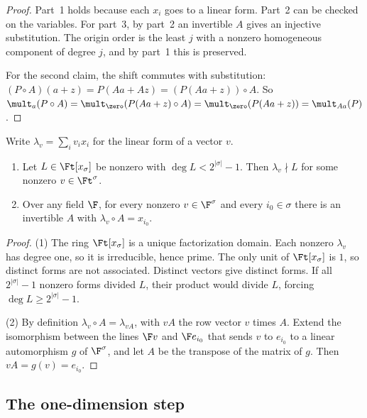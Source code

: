 \begin{proof}
Part~1 holds because each \(x_i\) goes to a linear form. Part~2 can be checked
on the variables. For part~3, by part~2 an invertible \(A\) gives an injective
substitution. The origin order is the least \(j\) with a nonzero homogeneous
component of degree \(j\), and by part~1 this is preserved.

For the second claim, the shift commutes with substitution:
\((P\circ A)(a+z)=P(Aa+Az)=(P(Aa+z))\circ A\). So
\(\mult_a(P\circ A)=\mult_{\zero}(P(Aa+z)\circ A)=\mult_{\zero}(P(Aa+z))=\mult_{Aa}(P)\).
\end{proof}

\begin{lemma}\label{lem:linear-form}
Write \(\lambda_v=\sum_iv_ix_i\) for the linear form of a vector \(v\).
\begin{enumerate}
 \item Let \(L\in\Ft[x_\sigma]\) be nonzero with \(\deg L<2^{|\sigma|}-1\). Then
 \(\lambda_v\nmid L\) for some nonzero \(v\in\Ft^\sigma\).
 \item Over any field \(\F\), for every nonzero \(v\in\F^\sigma\) and every
 \(i_0\in\sigma\) there is an invertible \(A\) with \(\lambda_v\circ A=x_{i_0}\).
\end{enumerate}
\end{lemma}

\begin{proof}
(1) The ring \(\Ft[x_\sigma]\) is a unique factorization domain. Each nonzero
\(\lambda_v\) has degree one, so it is irreducible, hence prime. The only unit of \(\Ft[x_\sigma]\) is \(1\), so
distinct forms are not associated. Distinct vectors give distinct forms. If all
\(2^{|\sigma|}-1\) nonzero forms divided \(L\), their product would divide \(L\),
forcing \(\deg L\ge2^{|\sigma|}-1\).

(2) By definition \(\lambda_v\circ A=\lambda_{vA}\), with \(vA\) the row vector \(v\)
times \(A\). Extend the isomorphism between the lines \(\F v\) and \(\F e_{i_0}\)
that sends \(v\) to \(e_{i_0}\) to a linear automorphism \(g\) of \(\F^\sigma\), and
let \(A\) be the transpose of the matrix of \(g\). Then \(vA=g(v)=e_{i_0}\).
\end{proof}

\subsection{The one-dimension step}

